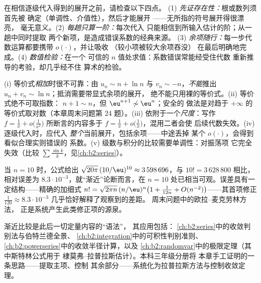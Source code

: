 \begin{method}[逐级代入检查清单]\label{met:b2:comparison:checklist}
在相信逐级代入得到的展开之前，请检查以下四点。
(1) \emph{先证存在性：}根或数列须首先被
确定（单调性、介值性），然后才能展开
——无所指的符号展开得很漂亮，
毫无意义。(2) \emph{每趟只算一阶：}每次代入
只能相信到所输入估计的阶；从一趟中同时提取
两个新项，是造成错误系数的经典来源。
(3) \emph{余项随行：}每一步代数运算都要携带
$o(\cdot)$，并让吸收
（较小项被较大余项吞没）
在最后明确地完成。(4) \emph{数值检验：}在一个
可信的 $n$ 值处求值：系数错误常能经受住代数
重新推导的考验，却几乎经不住
算术的检验。
\end{method}

\begin{remark}[常见陷阱]\label{rem:b2:comparison:pitfalls}
(i) 等价式\emph{相加}时很不可靠：由 $u_n \sim n + \ln n$ 与
$v_n \sim -n$，\emph{不能}推出 $u_n + v_n \sim \ln
n$；抵消需要带显式余项的展开，
绝不能只用裸的等价式。(ii) 等价式绝不可取指数：
$n + 1 \sim n$，但 $\eu^{n+1} \not\sim \eu^n$；安全的
做法是对趋于
$+\infty$ 的等价式取对数（本章周末问题第 24 题）。(iii)
依附于一个\emph{尺度}：写作
$f = \frac1x + o\bigl(\frac1{x^2}\bigr)$ 所断言的内容多于 $f =
\frac1x + o\bigl(\frac1x\bigr)$，混用二者会使
后续代数失效。(iv) 逐级代入时，应代入
\emph{整个}当前展开，包括余项——中途丢掉
某个 $o(\cdot)$，会得到看似合理实则错误的
系数。(v) 级数与积分的比较需要单调性：对振荡项
它完全失效（比较
$\sum\frac{\sin k}k$，见\cref{ch:b2:series}）。
\end{remark}

\begin{example}[斯特林公式的数值检验]\label{ex:b2:comparison:stirlingnum}
当 $n = 10$ 时，公式给出 $\sqrt{20\pi}\,(10/\eu)^{10}
\approx 3\,598\,696$，与 $10! = 3\,628\,800$ 相比，相对误差为
$8.3\cdot10^{-3}$，就“渐近”论断而言，在
$n = 10$ 处已相当可观。误差具有一定结构——精确的加细式 $n!
= \sqrt{2\pi n}\,(n/\eu)^n\bigl(1 + \frac1{12n} +
O(n^{-2})\bigr)$——其首项修正 $\frac1{120} \approx
8.3\cdot10^{-3}$ 几乎恰好解释了观察到的差距。
周末问题中的欧拉–麦克劳林方法，
正是系统产生此类修正项的源泉。
\end{example}

\begin{remark}[本章的应用]
渐近比较是此后一切定量内容的“语法”，
其应用包括：
\cref{ch:b2:series}中的收敛判别法与伯特兰德全景、
\cref{ch:b2:integration}中的可积性判别准则、
\cref{ch:b2:powerseries}中的收敛半径计算，以及
\cref{ch:b2:randomvar}中的极限定理（其中斯特林公式用于
棣莫弗–拉普拉斯估计）。本科三年级分册将
本章手工证明的一条思路——提取主项、控制
其余部分——系统化为拉普拉斯方法与控制收敛定理。
\end{remark}

